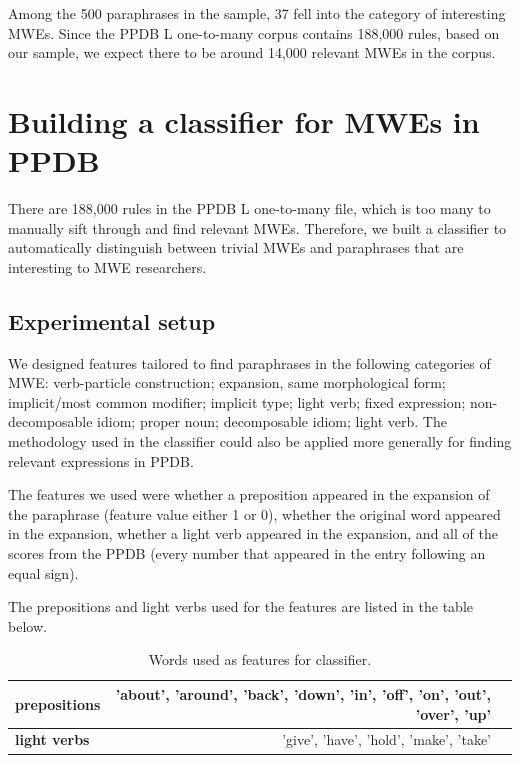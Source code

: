 \documentclass[11pt]{article}
\begin{document}
Among the 500 paraphrases in the sample, 37 fell into the category of interesting MWEs. Since the PPDB L one-to-many corpus contains 188,000 rules, based on our sample, we expect there to be around 14,000 relevant MWEs in the corpus.

\section{Building a classifier for MWEs in PPDB}

There are 188,000 rules in the PPDB L one-to-many file, which is too many to manually sift through and find relevant MWEs. Therefore, we built a classifier to automatically distinguish between trivial MWEs and paraphrases that are interesting to MWE researchers.

\subsection{Experimental setup}

We designed features tailored to find paraphrases in the following categories of MWE: verb-particle construction; expansion, same morphological form; implicit/most common modifier; implicit type; light verb; fixed expression; non-decomposable idiom; proper noun; decomposable idiom; light verb. The methodology used in the classifier could also be applied more generally for finding relevant expressions in PPDB.

The features we used were whether a preposition appeared in the expansion of the paraphrase (feature value either 1 or 0), whether the original word appeared in the expansion, whether a light verb appeared in the expansion, and all of the scores from the PPDB (every number that appeared in the entry following an equal sign).

The prepositions and light verbs used for the features are listed in the table below.

\begin{center}
\begin{table}
{\small
\hfill{}
\begin{tabular}{|l|rl|}
\hline \bf prepositions &  'about', 'around', 'back', 'down', 'in', 'off', 'on', 'out', 'over', 'up'  &\\ \hline
\bf light verbs &  'give', 'have', 'hold', 'make', 'take' &\\
\hline
\end{tabular}}
\hfill{}
\caption{\label{font-table} Words used as features for classifier. }
\end{table}
\end{center}
\end{document}
